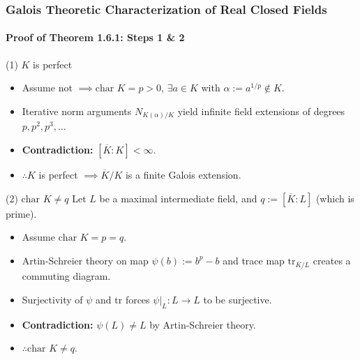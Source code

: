 \documentclass[11pt]{beamer}
\begin{document}
\begin{frame}
    \frametitle{Galois Theoretic Characterization of Real Closed Fields}
    \framesubtitle{Proof of Theorem 1.6.1: Steps 1 \& 2}

    \begin{block}{(1) $K$ is perfect}
        \begin{itemize}
            \item Assume not $\implies \text{char } K = p > 0$, $\exists a \in K$ with $\alpha := a^{1/p} \notin K$.
            \item Iterative norm arguments $N_{K(\alpha)/K}$ yield infinite field extensions of degrees $p, p^2, p^3, \dots$
            \item \textbf{\color{red} Contradiction:} $[\overline{K} : K] < \infty$.
            \item $\therefore K$ is perfect $\implies \overline{K}/K$ is a finite Galois extension.
        \end{itemize}
    \end{block}

    \begin{block}{(2) $\text{char } K \neq q$}
        Let $L$ be a maximal intermediate field, and $q := [\overline{K}:L]$ (which is prime).
        \begin{itemize}
            \item Assume $\text{char } K = p = q$.
            \item Artin-Schreier theory on map $\psi(b) := b^p - b$ and trace map $\text{tr}_{\overline{K}/L}$ creates a commuting diagram.
            \item Surjectivity of $\psi$ and $\text{tr}$ forces $\psi|_L : L \to L$ to be surjective.
            \item \textbf{\color{red} Contradiction:} $\psi(L) \neq L$ by Artin-Schreier theory.
            \item $\therefore \text{char } K \neq q$.
        \end{itemize}
    \end{block}
\end{frame}
\end{document}
